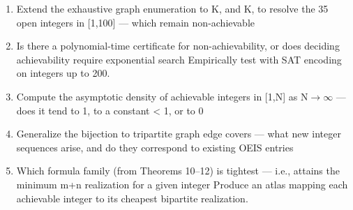 \begin{enumerate}[leftmargin=1.6em,itemsep=0.2em,topsep=0.2em,label=Q\arabic*.]
\item Extend the exhaustive graph enumeration to K, and K, to resolve the 35 open integers in [1,100] --- which remain non-achievable
\item Is there a polynomial-time certificate for non-achievability, or does deciding achievability require exponential search Empirically test with SAT encoding on integers up to 200.
\item Compute the asymptotic density of achievable integers in [1,N] as N$\rightarrow$$\infty$ --- does it tend to 1, to a constant \textless{} 1, or to 0
\item Generalize the bijection to tripartite graph edge covers --- what new integer sequences arise, and do they correspond to existing OEIS entries
\item Which formula family (from Theorems 10--12) is tightest --- i.e., attains the minimum m+n realization for a given integer Produce an atlas mapping each achievable integer to its cheapest bipartite realization.
\end{enumerate}

